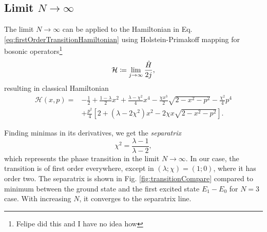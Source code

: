 \subsection{Limit \texorpdfstring{$N\rightarrow \infty$}{N->infty}}
The limit $N\rightarrow \infty$ can be applied to the Hamiltonian in Eq. \ref{eq:firstOrderTransitionHamiltonian} using Holstein-Primakoff mapping for bosonic operators\footnote{Felipe did this and I have no idea how}
\begin{equation}
    \mathcal{H}\coloneqq\lim_{j\rightarrow\infty}\frac{\hat{H}}{2j},
\end{equation}
resulting in classical Hamiltonian
\begin{equation}
    \begin{split}
        \mathcal{H}(x,p)=&-\frac{1}{2}+\frac{1-\lambda}{2}x^2+\frac{\lambda-\chi^2}{4}x^4-\frac{\chi x^3}{2}\sqrt{2-x^2-p^2}-\frac{\chi^2}{4}p^4\\
        &+\frac{p^2}{4}\left[2+(\lambda-2\chi^2)x^2-2\chi x\sqrt{2-x^2-p^2}\right].
    \end{split}
    \label{eq:HamiltonianClassicalLimit}
\end{equation}


Finding minimas in its derivatives, we get the \emph{separatrix}
\begin{equation}
    \chi^2=\frac{\lambda-1}{\lambda-2},
    \label{eq:separatrix}
\end{equation}
which represents the phase transition in the limit $N\rightarrow \infty$. In our case, the transition is of first order everywhere, except in $(\lambda;\chi)=(1;0)$, where it has order two. The separatrix is shown in Fig. \ref{fig:transitionCompare} compared to minimum between the ground state and the first excited state $E_1-E_0$ for $N=3$ case. With increasing $N$, it converges to the separatrix line.

